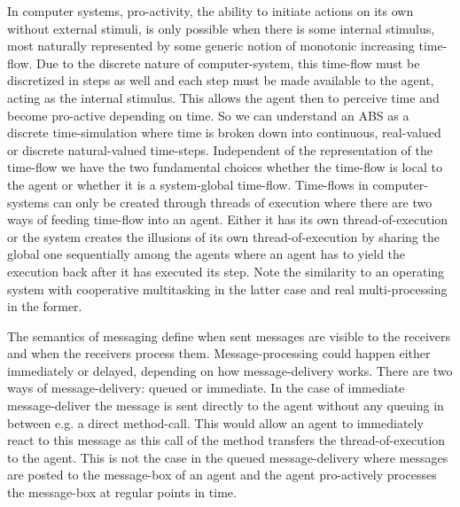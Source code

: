 In computer systems, pro-activity, the ability to initiate actions on its own without external stimuli, is only possible when there is some internal stimulus, most naturally represented by some generic notion of monotonic increasing time-flow. Due to the discrete nature of computer-system, this time-flow must be discretized in steps as well and each step must be made available to the agent, acting as the internal stimulus. This allows the agent then to perceive time and become pro-active depending on time. So we can understand an ABS as a discrete time-simulation where time is broken down into continuous, real-valued or discrete natural-valued time-steps. Independent of the representation of the time-flow we have the two fundamental choices whether the time-flow is local to the agent or whether it is a system-global time-flow. Time-flows in computer-systems can only be created through threads of execution where there are two ways of feeding time-flow into an agent. Either it has its own thread-of-execution or the system creates the illusions of its own thread-of-execution by sharing the global one sequentially among the agents where an agent has to yield the execution back after it has executed its step. Note the similarity to an operating system with cooperative multitasking in the latter case and real multi-processing in the former.

\medskip 

The semantics of messaging define when sent messages are visible to the receivers and when the receivers process them. Message-processing could happen either immediately or delayed, depending on how message-delivery works. There are two ways of message-delivery: queued or immediate. In the case of immediate message-deliver the message is sent directly to the agent without any queuing in between e.g. a direct method-call. This would allow an agent to immediately react to this message as this call of the method transfers the thread-of-execution to the agent. This is not the case in the queued message-delivery where messages are posted to the message-box of an agent and the agent pro-actively processes the message-box at regular points in time.

